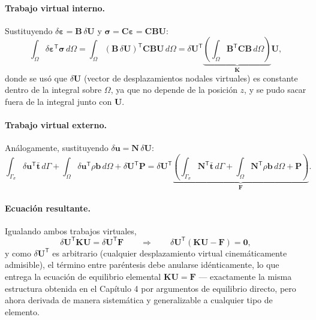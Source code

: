 \paragraph{Trabajo virtual interno.} Sustituyendo $\delta\bm\varepsilon = \bm B\,\delta\bm U$ y $\bm\sigma = \bm C\bm\varepsilon = \bm C\bm B\bm U$:
\[
\int_\Omega \delta\bm\varepsilon^{\mathsf T}\bm\sigma\, d\Omega
= \int_\Omega (\bm B\,\delta\bm U)^{\mathsf T} \bm C \bm B \bm U \, d\Omega
= \delta\bm U^{\mathsf T} \underbrace{\left(\int_\Omega \bm B^{\mathsf T}\bm C\bm B\, d\Omega\right)}_{\bm K} \bm U ,
\]
donde se usó que $\delta\bm U$ (vector de desplazamientos nodales virtuales) es constante dentro de la integral sobre $\Omega$, ya que no depende de la posición $z$, y se pudo sacar fuera de la integral junto con $\bm U$.

\paragraph{Trabajo virtual externo.} Análogamente, sustituyendo $\delta\bm u = \bm N\,\delta\bm U$:
\[
\int_{\Gamma_\sigma} \delta\bm u^{\mathsf T}\bar{\bm t}\, d\Gamma + \int_\Omega \delta\bm u^{\mathsf T} \rho\bm b\, d\Omega + \delta\bm U^{\mathsf T}\bm P
= \delta\bm U^{\mathsf T} \underbrace{\left( \int_{\Gamma_\sigma} \bm N^{\mathsf T} \bar{\bm t}\, d\Gamma + \int_\Omega \bm N^{\mathsf T} \rho \bm b\, d\Omega + \bm P \right)}_{\bm F} .
\]

\paragraph{Ecuación resultante.} Igualando ambos trabajos virtuales,
\[
\delta \bm U^{\mathsf T} \bm K \bm U = \delta\bm U^{\mathsf T}\bm F \qquad\Longrightarrow\qquad \delta\bm U^{\mathsf T}\left(\bm K\bm U - \bm F\right) = \bm 0 ,
\]
y como $\delta\bm U^{\mathsf T}$ es arbitrario (cualquier desplazamiento virtual cinemáticamente admisible), el término entre paréntesis debe anularse idénticamente, lo que entrega la ecuación de equilibrio elemental $\bm K\bm U = \bm F$ --- exactamente la misma estructura obtenida en el Capítulo 4 por argumentos de equilibrio directo, pero ahora derivada de manera sistemática y generalizable a cualquier tipo de elemento.

